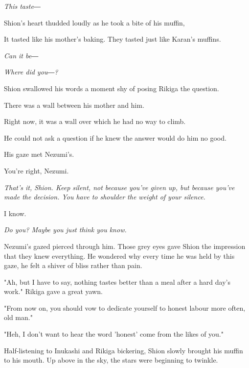 \emph{This taste―}

Shion's heart thudded loudly as he took a bite of his muffin,

It tasted like his mother's baking. They tasted just like Karan's
muffins.

\emph{Can it be―}

\emph{Where did you―?}

Shion swallowed his words a moment shy of posing Rikiga the question.

There was a wall between his mother and him.

Right now, it was a wall over which he had no way to climb.

He could not ask a question if he knew the answer would do him no good.

His gaze met Nezumi's.

You're right, Nezumi.

\emph{That's it, Shion. Keep silent, not because you've given up, but because
you've made the decision. You have to shoulder the weight of your
silence.}

I know.

\emph{Do you? Maybe you just think you know.}

Nezumi's gazed pierced through him. Those grey eyes gave Shion the
impression that they knew everything. He wondered why every time he was
held by this gaze, he felt a shiver of bliss rather than pain.

"Ah, but I have to say, nothing tastes better than a meal after a hard
day's work." Rikiga gave a great yawn.

"From now on, you should vow to dedicate yourself to honest labour more
often, old man."

"Heh, I don't want to hear the word 'honest' come from the likes of
you."

Half-listening to Inukashi and Rikiga bickering, Shion slowly brought
his muffin to his mouth. Up above in the sky, the stars were beginning
to twinkle.